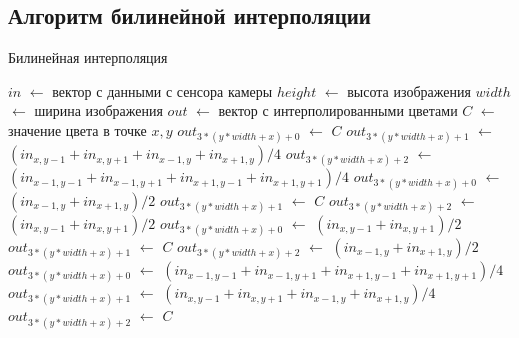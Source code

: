 \subsection{Алгоритм билинейной интерполяции}
\clearpage
\begin{algorithm}[H]
	\caption{Билинейная интерполяция}
	\label{alg:bilin}
	\begin{algorithmic}[1]
		\State $in$ $\gets$ вектор с данными с сенсора камеры
		\State $height$ $\gets$ высота изображения
		\State $width$ $\gets$ ширина изображения
		\State $out$ $\gets$ вектор с интерполированными цветами
			\State $C$ $\gets$ значение цвета в точке $x,y$
					\State $out_{3 * (y * width + x) + 0}$ $\gets$ $C$
					\State $out_{3 * (y * width + x) + 1}$ $\gets$ $(in_{x, y-1} + in_{x, y + 1} + in_{x - 1, y} + in_{x + 1, y}) / 4$
					\State $out_{3 * (y * width + x) + 2}$ $\gets$ $(in_{x-1, y-1} + in_{x-1, y+1} + in_{x+1, y-1} + in_{x+1, y+1}) / 4$
			\EndIf
					\State $out_{3 * (y * width + x) + 0}$ $\gets$ $(in_{x-1, y} + in_{x+1, y}) / 2$
					\State $out_{3 * (y * width + x) + 1}$ $\gets$ $C$
					\State $out_{3 * (y * width + x) + 2}$ $\gets$ $(in_{x, y - 1} + in_{x, y+1}) / 2$
			\EndIf
					\State $out_{3 * (y * width + x) + 0}$ $\gets$ $(in_{x, y - 1} + in_{x, y+1}) / 2$
					\State $out_{3 * (y * width + x) + 1}$ $\gets$ $C$
					\State $out_{3 * (y * width + x) + 2}$ $\gets$ $(in_{x-1, y} + in_{x+1, y}) / 2$
			\EndIf
					\State $out_{3 * (y * width + x) + 0}$ $\gets$ $(in_{x-1, y-1} + in_{x-1, y+1} + in_{x+1, y-1} + in_{x+1, y+1}) / 4$
					\State $out_{3 * (y * width + x) + 1}$ $\gets$ $(in_{x, y-1} + in_{x, y + 1} + in_{x - 1, y} + in_{x + 1, y}) / 4$
					\State $out_{3 * (y * width + x) + 2}$ $\gets$ $C$
			\EndIf
		\EndFor
	\EndFor
	\end{algorithmic}
\end{algorithm}

